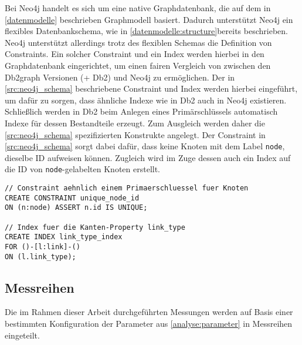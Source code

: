 Bei Neo4j handelt es sich um eine native Graphdatenbank, die auf dem in \autoref{datenmodelle} beschrieben Graphmodell basiert. Dadurch unterstützt Neo4j ein flexibles Datenbankschema, wie in \autoref{datenmodelle:structure}bereits beschrieben. Neo4j unterstützt allerdings trotz des flexiblen Schemas die Definition von Constraints. Ein solcher Constraint und ein Index werden hierbei in den Graphdatenbank eingerichtet, um einen fairen Vergleich von zwischen den Db2graph Versionen (+ Db2) und Neo4j zu ermöglichen. Der in \autoref{src:neo4j_schema} beschriebene Constraint und Index werden hierbei eingeführt, um dafür zu sorgen, dass ähnliche Indexe wie in Db2 auch in Neo4j existieren. Schließlich werden in Db2 beim Anlegen eines Primärschlüssels automatisch Indexe für dessen Bestandteile erzeugt. Zum Ausgleich werden daher die \autoref{src:neo4j_schema} spezifizierten Konstrukte angelegt. Der Constraint in \autoref{src:neo4j_schema} sorgt dabei dafür, dass keine Knoten mit dem Label \texttt{node}, dieselbe ID aufweisen können. Zugleich wird im Zuge dessen auch ein Index auf die ID von \texttt{node}-gelabelten Knoten erstellt.

\begin{lstlisting}[label=src:neo4j_schema,caption={Neo4j Instanz Datenbankschema},language=CQL]
// Constraint aehnlich einem Primaerschluessel fuer Knoten
CREATE CONSTRAINT unique_node_id 
ON (n:node) ASSERT n.id IS UNIQUE;

// Index fuer die Kanten-Property link_type
CREATE INDEX link_type_index 
FOR ()-[l:link]-() 
ON (l.link_type);
\end{lstlisting}

\subsection{Messreihen}
\label{analyse:messreihen}
Die im Rahmen dieser Arbeit durchgeführten Messungen werden auf Basis einer bestimmten Konfiguration der Parameter aus \autoref{analyse:parameter} in Messreihen eingeteilt. 